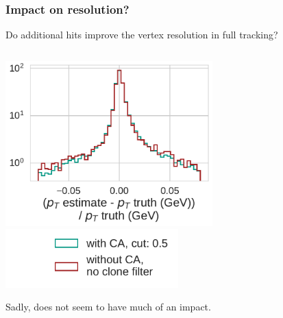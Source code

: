 \documentclass[18pt, aspectratio=169]{beamer}
\begin{document}
\begin{frame}
  \frametitle{Impact on resolution?}
  Do additional hits improve the vertex resolution in full tracking?
  \begin{columns}
    \begin{column}{.5\textwidth}
      \begin{center}
        \includegraphics[width=0.6\textwidth]{figures/pt_resolution_on_matched_fullreco_trainedWithFakes.pdf}\\
        \includegraphics[width=0.5\textwidth]{figures/legend_resolution_studies.pdf}
      \end{center}
      Sadly, does not seem to have much of an impact.
    \end{column}
    

\end{columns}
\end{frame}
\end{document}
